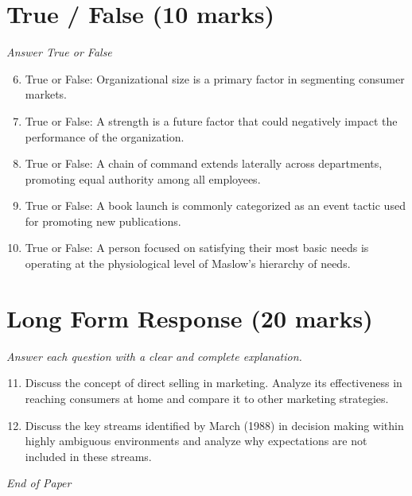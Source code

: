 \documentclass[12pt]{article}
\begin{document}
\section*{True / False (10 marks)}
\textit{Answer True or False}
\begin{enumerate}[label=\arabic*.]
\setcounter{enumi}{5}
\item True or False: Organizational size is a primary factor in segmenting consumer markets.
\item True or False: A strength is a future factor that could negatively impact the performance of the organization.
\item True or False: A chain of command extends laterally across departments, promoting equal authority among all employees.
\item True or False: A book launch is commonly categorized as an event tactic used for promoting new publications.
\item True or False: A person focused on satisfying their most basic needs is operating at the physiological level of Maslow's hierarchy of needs.
\end{enumerate}

\section*{Long Form Response (20 marks)}
\textit{Answer each question with a clear and complete explanation.}
\begin{enumerate}[label=\arabic*.]
\setcounter{enumi}{10}
\item Discuss the concept of direct selling in marketing. Analyze its effectiveness in reaching consumers at home and compare it to other marketing strategies.
\item Discuss the key streams identified by March (1988) in decision making within highly ambiguous environments and analyze why expectations are not included in these streams.
\end{enumerate}

\vfill
\noindent\textit{End of Paper}
\end{document}
